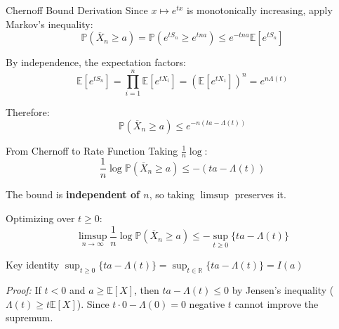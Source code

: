 \documentclass[aspectratio=169]{beamer}
\newcommand{\E}{\mathbb{E}}
\renewcommand{\P}{\mathbb{P}}
\newcommand{\R}{\mathbb{R}}
\begin{document}
\begin{frame}{Chernoff Bound Derivation}
  Since $x \mapsto e^{tx}$ is monotonically increasing, apply Markov's inequality:
  \[
    \P(\overline{X}_n \ge a) = \P(e^{tS_n} \ge e^{tna}) \le e^{-tna}\E[e^{tS_n}]
  \]

  By independence, the expectation factors:
  \[
    \E[e^{tS_n}] = \prod_{i=1}^n \E[e^{tX_i}] = \left(\E[e^{tX_1}]\right)^n = e^{n\Lambda(t)}
  \]

  Therefore:
  \begin{equation*}
    \boxed{\P(\overline{X}_n \ge a) \le e^{-n(ta - \Lambda(t))}}
  \end{equation*}
\end{frame}

\begin{frame}{From Chernoff to Rate Function}
  Taking $\frac{1}{n}\log$:
  \[
    \frac{1}{n}\log\P(\overline{X}_n \ge a) \le -(ta - \Lambda(t))
  \]

  The bound is \textbf{independent of $n$}, so taking $\limsup$ preserves it.

  \vspace{0.3cm}
  Optimizing over $t \ge 0$:
  \[
    \limsup_{n\to\infty} \frac{1}{n}\log\P(\overline{X}_n \ge a) \le -\sup_{t \ge 0}\{ta - \Lambda(t)\}
  \]

  \vspace{0.2cm}
  \begin{block}{Key identity}
    $\sup_{t \ge 0}\{ta - \Lambda(t)\} = \sup_{t \in \R}\{ta - \Lambda(t)\} = I(a)$

    \smallskip
    \textit{Proof:} If $t < 0$ and $a \ge \E[X]$, then $ta - \Lambda(t) \le 0$ by Jensen's inequality ($\Lambda(t) \ge t\E[X]$). Since $t \cdot 0 - \Lambda(0) = 0$ negative $t$ cannot improve the supremum.
  \end{block}
\end{frame}
\end{document}
